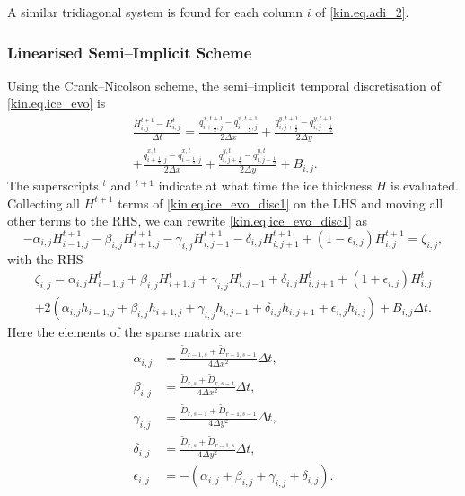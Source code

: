 A similar tridiagonal system is found for each column $i$ of \eqref{kin.eq.adi_2}.

\subsubsection{Linearised Semi--Implicit Scheme}
Using the Crank--Nicolson scheme, the semi--implicit temporal discretisation of \eqref{kin.eq.ice_evo} is
\begin{multline}
\label{kin.eq.ice_evo_disc1}
  \frac{H^{t+1}_{i,j}-H^t_{i,j}}{\Delta t}=\frac{q^{x,t+1}_{i+\frac12,j}-q^{x,t+1}_{i-\frac12,j}}{2\Delta x}+\frac{q^{y,t+1}_{i,j+\frac12}-q^{y,t+1}_{i,j-\frac12}}{2\Delta y} \\
  +\frac{q^{x,t}_{i+\frac12,j}-q^{x,t}_{i-\frac12,j}}{2\Delta x}+\frac{q^{y,t}_{i,j+\frac12}-q^{y,t}_{i,j-\frac12}}{2\Delta y}+ B_{i,j}.
\end{multline}
The superscripts $^t$ and $^{t+1}$ indicate at what time the ice thickness $H$ is evaluated. Collecting all $H^{t+1}$ terms of \eqref{kin.eq.ice_evo_disc1} on the LHS and moving all other terms to the RHS, we can rewrite \eqref{kin.eq.ice_evo_disc1} as
\begin{equation}
  \label{kin.eq.evo_matrix}
  -\alpha_{i,j}H^{t+1}_{i-1,j} - \beta_{i,j}H^{t+1}_{i+1,j} - \gamma_{i,j}H^{t+1}_{i,j-1} - \delta_{i,j}H^{t+1}_{i,j+1}+ (1-\epsilon_{i,j})H^{t+1}_{i,j} = \zeta_{i,j},
\end{equation}
with the RHS
\begin{multline}
  \zeta_{i,j} = \alpha_{i,j}H^{t}_{i-1,j} + \beta_{i,j}H^{t}_{i+1,j} + \gamma_{i,j}H^{t}_{i,j-1} + \delta_{i,j}H^{t}_{i,j+1} + (1+\epsilon_{i,j})H^{t}_{i,j} \\
  + 2(\alpha_{i,j}h_{i-1,j} + \beta_{i,j}h_{i+1,j} + \gamma_{i,j}h_{i,j-1} + \delta_{i,j}h_{i,j+1}+ \epsilon_{i,j}h_{i,j}) + B_{i,j}\Delta t.
\end{multline}
Here the elements of the sparse matrix are
\begin{subequations}
  \begin{align}
    \alpha_{i,j} &=\frac{\tilde{D}_{r-1,s}+\tilde{D}_{r-1,s-1}}{4\Delta x^2}\Delta t,\\
    \beta_{i,j} &=\frac{\tilde{D}_{r,s}+\tilde{D}_{r,s-1}}{4\Delta x^2}\Delta t,\\
    \gamma_{i,j} &=\frac{\tilde{D}_{r,s-1}+\tilde{D}_{r-1,s-1}}{4\Delta y^2}\Delta t,\\
    \delta_{i,j} &=\frac{\tilde{D}_{r,s}+\tilde{D}_{r-1,s}}{4\Delta y^2}\Delta t,\\
    \epsilon_{i,j} &=-(\alpha_{i,j}+\beta_{i,j}+\gamma_{i,j}+\delta_{i,j}).
  \end{align}
\end{subequations}


